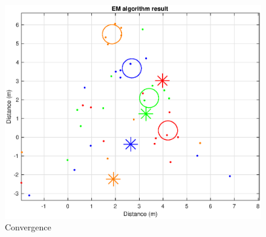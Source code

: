 \begin{figure}[H]
\centering
\includegraphics[scale=0.55]{fig/em_local.eps}
\caption[Local optimum of EM algorithm]{Convergence }
\label{fig:convergence}
\end{figure}